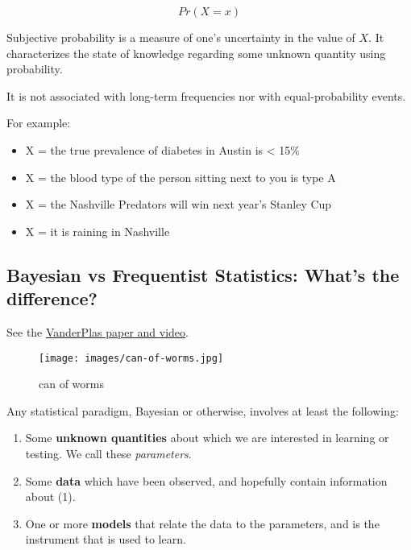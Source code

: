 \documentclass[11pt]{article}
\makeatletter
\def\maxwidth{\ifdim\Gin@nat@width>\linewidth\linewidth
    \else\Gin@nat@width\fi}
\let\Oldincludegraphics\includegraphics
\renewcommand{\includegraphics}[1]{\Oldincludegraphics[width=.8\maxwidth]{#1}}
\providecommand{\tightlist}{%
      \setlength{\itemsep}{0pt}\setlength{\parskip}{0pt}}
\makeatother
\begin{document}
\[Pr(X=x)\]

Subjective probability is a measure of one's uncertainty in the value of
\(X\). It characterizes the state of knowledge regarding some unknown
quantity using probability.

It is not associated with long-term frequencies nor with
equal-probability events.

For example:

\begin{itemize}
\tightlist
\item
  X = the true prevalence of diabetes in Austin is \textless{} 15\%
\item
  X = the blood type of the person sitting next to you is type A
\item
  X = the Nashville Predators will win next year's Stanley Cup
\item
  X = it is raining in Nashville
\end{itemize}

    \hypertarget{bayesian-vs-frequentist-statistics-whats-the-difference}{%
\subsection{Bayesian vs Frequentist Statistics: What's the
difference?}\label{bayesian-vs-frequentist-statistics-whats-the-difference}}

See the
\href{http://conference.scipy.org/proceedings/scipy2014/pdfs/vanderplas.pdf}{VanderPlas
paper and video}.

\begin{figure}
\centering
\texttt{[image: images/can-of-worms.jpg]}
\caption{can of worms}
\end{figure}

Any statistical paradigm, Bayesian or otherwise, involves at least the
following:

\begin{enumerate}
\def\labelenumi{\arabic{enumi}.}
\tightlist
\item
  Some \textbf{unknown quantities} about which we are interested in
  learning or testing. We call these \emph{parameters}.
\item
  Some \textbf{data} which have been observed, and hopefully contain
  information about (1).
\item
  One or more \textbf{models} that relate the data to the parameters,
  and is the instrument that is used to learn.
\end{enumerate}
\end{document}
